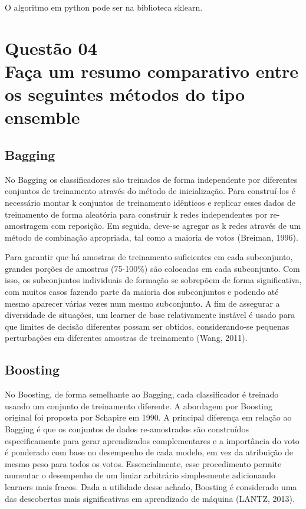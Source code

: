 \documentclass[12pt]{article}
\begin{document}
O algoritmo em python pode ser na biblioteca sklearn.
\section{Questão 04\\
  Faça um resumo comparativo entre os seguintes métodos do tipo ensemble
 }
\subsection{Bagging}
No Bagging os classificadores são treinados de forma independente por diferentes conjuntos de treinamento através do método de inicialização.
Para construí-los é necessário montar k conjuntos de treinamento idênticos e replicar esses dados de treinamento de forma aleatória para construir k redes independentes por re-amostragem com reposição.
Em seguida, deve-se agregar as k redes através de um método de combinação apropriada, tal como a maioria de votos (Breiman, 1996).

Para garantir que há amostras de treinamento suficientes em cada subconjunto, grandes porções de amostras (75-100\%) são colocadas em cada subconjunto.
Com isso, os subconjuntos individuais de formação se sobrepõem de forma significativa, com muitos casos fazendo parte da maioria dos subconjuntos e podendo até mesmo aparecer várias vezes num mesmo subconjunto.
A fim de assegurar a diversidade de situações, um learner de base relativamente instável é usado para que limites de decisão diferentes possam ser obtidos, considerando-se pequenas perturbações em diferentes amostras de treinamento (Wang, 2011).

\subsection{Boosting}
No Boosting, de forma semelhante ao Bagging, cada classificador é treinado usando um conjunto de treinamento diferente.
A abordagem por Boosting original foi proposta por Schapire em 1990.
A principal diferença em relação ao Bagging é que os conjuntos de dados re-amostrados são construídos especificamente para gerar aprendizados complementares e a importância do voto é ponderado com base no desempenho de cada modelo, em vez da atribuição de mesmo peso para todos os votos.
Essencialmente, esse procedimento permite aumentar o desempenho de um limiar arbitrário simplesmente adicionando learners mais fracos.
Dada a utilidade desse achado, Boosting é considerado uma das descobertas mais significativas em aprendizado de máquina (LANTZ, 2013).
\end{document}
